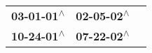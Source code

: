 \begin{supertabular}{lll}
 \textbf{03-01-01\textsuperscript{$\wedge$}} &  \textbf{02-05-02\textsuperscript{$\wedge$}} \\
 \textbf{10-24-01\textsuperscript{$\wedge$}} &  \textbf{07-22-02\textsuperscript{$\wedge$}} \\
\end{supertabular}

